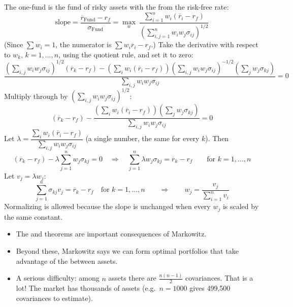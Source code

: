 The one-fund is the fund of risky assets with the  from the risk-free rate:
\[\text{slope} = \frac{\overline{r}_{\text{Fund}} - r_f}{\sigma_{\text{Fund}}} = \max_{w}\ \frac{\displaystyle\sum_{i=1}^{n}w_i(\overline{r}_i - r_f)}{\displaystyle\left(\sum_{i,j=1}^{n}w_iw_j\sigma_{ij}\right)^{1/2}}\]
(Since $\sum w_i = 1$, the numerator is $\sum w_i\overline{r}_i - r_f$.) Take the derivative with respect to $w_k$, $k = 1, \dots, n$, using the quotient rule, and set it to zero:
\[\frac{\displaystyle\left(\sum_{i,j}w_iw_j\sigma_{ij}\right)^{1/2}(\overline{r}_k - r_f) - \left(\sum_{i}w_i(\overline{r}_i - r_f)\right)\left(\sum_{i,j}w_iw_j\sigma_{ij}\right)^{-1/2}\left(\sum_{j}w_j\sigma_{kj}\right)}{\displaystyle\sum_{i,j}w_iw_j\sigma_{ij}} = 0\]
Multiply through by $\left(\sum_{i,j}w_iw_j\sigma_{ij}\right)^{1/2}$:
\[(\overline{r}_k - r_f) - \frac{\left(\sum_{i}w_i(\overline{r}_i - r_f)\right)\left(\sum_{j}w_j\sigma_{kj}\right)}{\sum_{i,j}w_iw_j\sigma_{ij}} = 0\]
Let $\lambda = \dfrac{\sum_{i}w_i(\overline{r}_i - r_f)}{\sum_{i,j}w_iw_j\sigma_{ij}}$ (a single number, the same for every $k$). Then
\[(\overline{r}_k - r_f) - \lambda\sum_{j=1}^{n}w_j\sigma_{kj} = 0 \quad \Rightarrow \quad \sum_{j=1}^{n}\lambda w_j\sigma_{kj} = \overline{r}_k - r_f \qquad \text{for } k = 1, \dots, n\]
Let $v_j = \lambda w_j$:
\[\boxed{\sum_{j=1}^{n}\sigma_{kj}v_j = \overline{r}_k - r_f \quad \text{for } k = 1, \dots, n \qquad \Longrightarrow \qquad w_j = \frac{v_j}{\sum_{i=1}^{n}v_i}}\]
Normalizing is allowed because the slope is unchanged when every $w_j$ is scaled by the same constant.

\begin{itemize}
    \item The  and  theorems are important consequences of Markowitz.
    \item Beyond these, Markowitz says we can form optimal portfolios that take advantage of the  between assets.
    \item A serious difficulty: among $n$ assets there are $\frac{n(n-1)}{2}$ covariances. That is a lot! The market has thousands of assets (e.g.\ $n = 1000$ gives 499,500 covariances to estimate).
\end{itemize}

